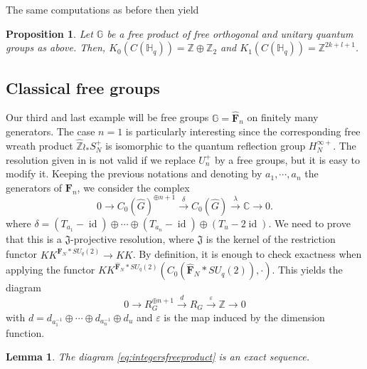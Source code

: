 \documentclass[a4paper, 11pt]{amsart}
\theoremstyle{plain}
\newtheorem{prop}[thm]{Proposition}
\newtheorem{lem}[thm]{Lemma}
\theoremstyle{definition}
\theoremstyle{remark}
\DeclareMathOperator{\id}{id}
\newcommand{\C}{\mathbb{C}}
\newcommand{\F}{\mathbf{F}}
\newcommand{\G}{\mathbb{G}}
\newcommand{\HH}{\mathbb{H}}
\newcommand{\Z}{\mathbb{Z}}
\begin{document}
The same computations as before then yield

\begin{prop}
Let $\G$ be a free product of free orthogonal and unitary quantum groups as above. Then, $K_{0}(C(\HH_{q})) = \Z\oplus \Z_{2}$ and $K_{1}(C(\HH_{q})) = \Z^{2k+l+1}$.
\end{prop}

\subsection{Classical free groups}

Our third and last example will be free groups $\G = \widehat{\F}_{n}$ on finitely many generators. The case $n=1$ is particularly interesting since the corresponding free wreath product $\widehat{\Z}\wr_{\ast}S_{N}^{+}$ is isomorphic to the quantum reflection group $H_{N}^{\infty +}$. The resolution given in \cite{vergnioux2013k} is not valid if we replace $U_{n}^{+}$ by a free groups, but it is easy to modify it. Keeping the previous notations and denoting by $a_{1}, \cdots, a_{n}$ the generators of $\F_{n}$, we consider the complex
\begin{equation*}
0 \longrightarrow C_{0}(\widehat{G})^{\oplus n+1} \overset{\delta}{\longrightarrow} C_{0}(\widehat{G}) \overset{\lambda}{\longrightarrow} \C \longrightarrow 0.
\end{equation*}
where $\delta = (T_{a_{1}} - \id)\oplus\cdots\oplus (T_{a_{n}} - \id)\oplus (T_{u} - 2\id)$. We need to prove that this is a $\mathfrak{J}$-projective resolution, where $\mathfrak{J}$ is the kernel of the restriction functor $KK^{\widehat{\F}_{N}\ast SU_{q}(2)}\to KK$. By definition, it is enough to check exactness when applying the functor $KK^{\widehat{\F}_{N}\ast SU_{q}(2)}(C_{0}(\widehat{\F}_{N}\ast SU_{q}(2)), \cdot)$. This yields the diagram
\begin{equation}\label{eq:integersfreeproduct}
0 \longrightarrow R_{G}^{\oplus n+1} \overset{d}{\longrightarrow} R_{G} \overset{\varepsilon}{\longrightarrow} \Z \longrightarrow 0
\end{equation}
with $d = d_{a_{1}^{-1}}\oplus \cdots\oplus d_{a_{n}^{-1}}\oplus d_{u}$ and $\varepsilon$ is the map induced by the dimension function.

\begin{lem}
The diagram \eqref{eq:integersfreeproduct} is an exact sequence.
\end{lem}
\end{document}
